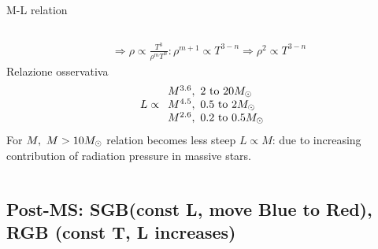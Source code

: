 \begin{frame}{M-L relation}
\begin{columns}[T]
\begin{column}{0.6\textwidth}
\begin{align*}
    &\Rightarrow\rho\propto \frac{T^3}{\rho^mT^n}: \rho^{m+1}\propto T^{3-n}\Rightarrow\rho^2\propto T^{3-n}
\end{align*}
    Relazione osservativa
\begin{equation*}
L\propto\begin{array}{l}
M\expy{3.6},\ \numrange{2}{20}\msun{}\\
M\expy{4.5},\ \numrange{0.5}{2}\msun{}\\
M\expy{2.6},\ \numrange{0.2}{0.5}\msun{}\\
\end{array}
\end{equation*}
For $M,\ M>10\msun{}$ relation becomes less steep $L\propto M$: due to increasing contribution of radiation pressure in massive stars.
\end{column}\end{columns}
\end{frame}

\subsection{Post-MS: SGB(const L, move Blue to Red), RGB (const T, L increases)}


